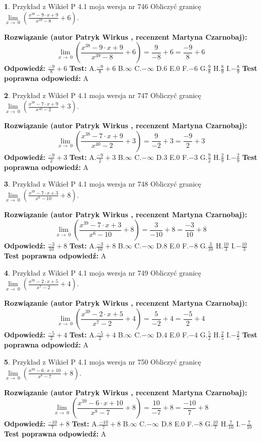 \documentclass[12pt, a4paper]{article}
\theoremstyle{definition} %
\newtheorem{zad}{}
\newcommand{\zadStart}[1]{\begin{zad}#1\newline}
\newcommand{\zadStop}{\end{zad}}
\newcommand{\rozwStart}[2]{\noindent \textbf{Rozwiązanie (autor #1 , recenzent #2): }\newline}
\newcommand{\rozwStop}{\newline}
\newcommand{\odpStart}{\noindent \textbf{Odpowiedź:}\newline}
\newcommand{\odpStop}{\newline}
\newcommand{\testStart}{\noindent \textbf{Test:}\newline}
\newcommand{\testStop}{\newline}
\newcommand{\kluczStart}{\noindent \textbf{Test poprawna odpowiedź:}\newline}
\newcommand{\kluczStop}{\newline}
\begin{document}
\zadStart{Przykład z Wikieł P 4.1 moja wersja nr 746}
Obliczyć granicę $\lim\limits_{x\to\ 0}(\frac{x^{38}-9 \cdot x +9}{x^{39}-8}+6)$.
\zadStop
\rozwStart{Patryk Wirkus}{Martyna Czarnobaj}
$$\lim\limits_{x\to\ 0}(\frac{x^{38}-9 \cdot x +9}{x^{39}-8}+6)=\frac{9}{-8}+6=\frac{-9}{8}+6$$
\rozwStop
\odpStart
$\frac{-9}{8}+6$
\odpStop
\testStart
A.$\frac{-9}{8}+6$
B.$\infty$
C.$-\infty$
D.$6$
E.$0$
F.$-6$
G.$\frac{9}{8}$
H.$\frac{8}{9}$
I.$-\frac{8}{9}$
\testStop
\kluczStart
A
\kluczStop



\zadStart{Przykład z Wikieł P 4.1 moja wersja nr 747}
Obliczyć granicę $\lim\limits_{x\to\ 0}(\frac{x^{38}-7 \cdot x +9}{x^{40}-2}+3)$.
\zadStop
\rozwStart{Patryk Wirkus}{Martyna Czarnobaj}
$$\lim\limits_{x\to\ 0}(\frac{x^{38}-7 \cdot x +9}{x^{40}-2}+3)=\frac{9}{-2}+3=\frac{-9}{2}+3$$
\rozwStop
\odpStart
$\frac{-9}{2}+3$
\odpStop
\testStart
A.$\frac{-9}{2}+3$
B.$\infty$
C.$-\infty$
D.$3$
E.$0$
F.$-3$
G.$\frac{9}{2}$
H.$\frac{2}{9}$
I.$-\frac{2}{9}$
\testStop
\kluczStart
A
\kluczStop



\zadStart{Przykład z Wikieł P 4.1 moja wersja nr 748}
Obliczyć granicę $\lim\limits_{x\to\ 0}(\frac{x^{39}-7 \cdot x +3}{x^{6}-10}+8)$.
\zadStop
\rozwStart{Patryk Wirkus}{Martyna Czarnobaj}
$$\lim\limits_{x\to\ 0}(\frac{x^{39}-7 \cdot x +3}{x^{6}-10}+8)=\frac{3}{-10}+8=\frac{-3}{10}+8$$
\rozwStop
\odpStart
$\frac{-3}{10}+8$
\odpStop
\testStart
A.$\frac{-3}{10}+8$
B.$\infty$
C.$-\infty$
D.$8$
E.$0$
F.$-8$
G.$\frac{3}{10}$
H.$\frac{10}{3}$
I.$-\frac{10}{3}$
\testStop
\kluczStart
A
\kluczStop



\zadStart{Przykład z Wikieł P 4.1 moja wersja nr 749}
Obliczyć granicę $\lim\limits_{x\to\ 0}(\frac{x^{39}-2 \cdot x +5}{x^{7}-2}+4)$.
\zadStop
\rozwStart{Patryk Wirkus}{Martyna Czarnobaj}
$$\lim\limits_{x\to\ 0}(\frac{x^{39}-2 \cdot x +5}{x^{7}-2}+4)=\frac{5}{-2}+4=\frac{-5}{2}+4$$
\rozwStop
\odpStart
$\frac{-5}{2}+4$
\odpStop
\testStart
A.$\frac{-5}{2}+4$
B.$\infty$
C.$-\infty$
D.$4$
E.$0$
F.$-4$
G.$\frac{5}{2}$
H.$\frac{2}{5}$
I.$-\frac{2}{5}$
\testStop
\kluczStart
A
\kluczStop



\zadStart{Przykład z Wikieł P 4.1 moja wersja nr 750}
Obliczyć granicę $\lim\limits_{x\to\ 0}(\frac{x^{39}-6 \cdot x +10}{x^{8}-7}+8)$.
\zadStop
\rozwStart{Patryk Wirkus}{Martyna Czarnobaj}
$$\lim\limits_{x\to\ 0}(\frac{x^{39}-6 \cdot x +10}{x^{8}-7}+8)=\frac{10}{-7}+8=\frac{-10}{7}+8$$
\rozwStop
\odpStart
$\frac{-10}{7}+8$
\odpStop
\testStart
A.$\frac{-10}{7}+8$
B.$\infty$
C.$-\infty$
D.$8$
E.$0$
F.$-8$
G.$\frac{10}{7}$
H.$\frac{7}{10}$
I.$-\frac{7}{10}$
\testStop
\kluczStart
A
\kluczStop
\end{document}
